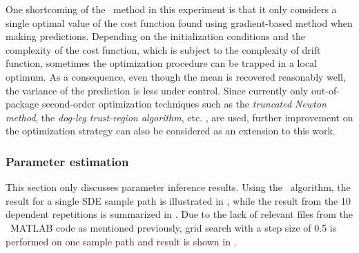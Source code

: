 One shortcoming of the \algolpmfsde\ method in this experiment is that it only considers a single optimal value of the cost function found using gradient-based method when making predictions.
Depending on the initialization conditions and the complexity of the cost function, which is subject to the complexity of drift function, sometimes the optimization procedure can be trapped in a local optimum.
As a consequence, even though the mean is  recovered reasonably well, the variance of the prediction is less under control.
Since currently only out-of-package second-order optimization techniques such as the \emph{truncated Newton method}, the \emph{dog-leg trust-region algorithm}, etc. \citep{nocedal2006numerical}, are used, further improvement on the optimization strategy can also be considered as an extension to this work.

\subsubsection*{Parameter estimation}

This section only discusses parameter inference results. 
Using the \algolpmfsde\ algorithm, the result for a single SDE sample path is illustrated in , while the result from the 10 dependent repetitions is summarized in .
Due to the lack of relevant files from the \algovgpamf\ MATLAB code as mentioned previously, grid search with a step size of 0.5 is performed on one sample path and result is shown in .

